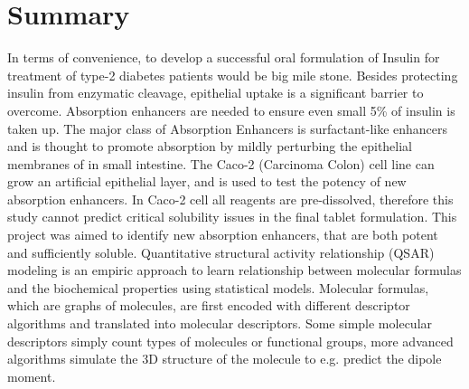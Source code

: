 \chapter{Summary}
In terms of convenience, to develop a successful oral formulation of Insulin for treatment of type-2 diabetes patients would be big mile stone. Besides protecting insulin from enzymatic cleavage, epithelial uptake is a significant barrier to overcome. Absorption enhancers are needed to ensure even small 5\% of insulin is taken up. The major class of Absorption Enhancers is surfactant-like enhancers and is thought to promote absorption by mildly perturbing the epithelial membranes of in small intestine. The Caco-2 (Carcinoma Colon) cell line can grow an artificial epithelial layer, and is used to test the potency of new absorption enhancers. In Caco-2 cell all reagents are pre-dissolved, therefore this study cannot predict critical solubility issues in the final tablet formulation. This project was aimed to identify new absorption enhancers, that are both potent and sufficiently soluble. Quantitative structural activity relationship (QSAR) modeling is an empiric approach to learn relationship between molecular formulas and the biochemical properties using statistical models. Molecular formulas, which are graphs of molecules, are first encoded with different descriptor algorithms and translated into molecular descriptors. Some simple molecular descriptors simply count types of molecules or functional groups, more advanced algorithms simulate the 3D structure of the molecule to e.g. predict the dipole moment.
